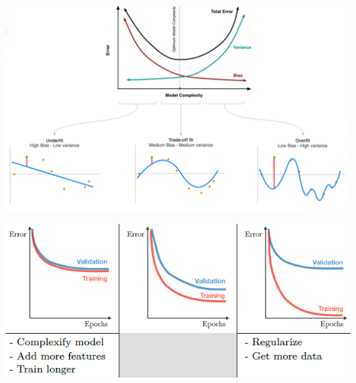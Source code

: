 \documentclass[letterpaper, 10.5pt,landscape]{article}
\begin{document}
\begin{multicols*}{3}
\vspace*{\fill}


\begin{center}
    \begin{minipage}{\linewidth}
        \includegraphics[width=\textwidth]{figures/bias_variance_overfitting_underfitting.PNG}
    \end{minipage}
\end{center}

\vspace{-5mm}

\begin{center}
    \begin{minipage}{0.9\linewidth}
        \includegraphics[width=\textwidth]{figures/bias_variance_overfitting_underfitting_LearningCurves.PNG}
    \end{minipage}
\end{center}









\end{multicols*}
\end{document}
